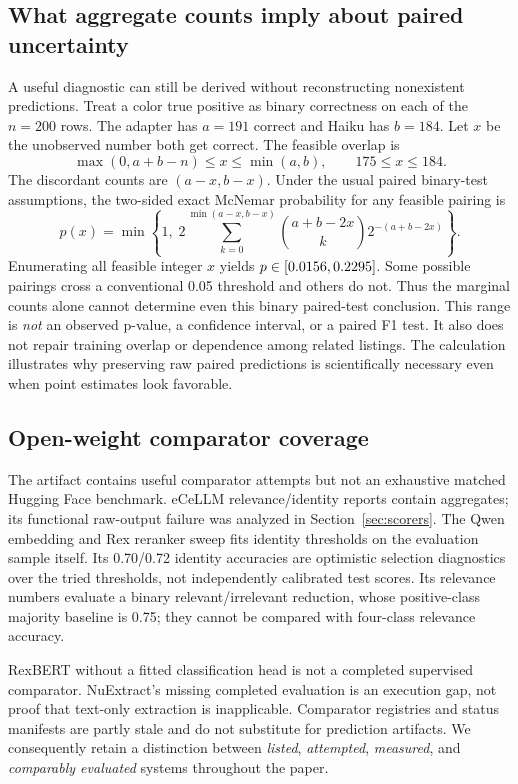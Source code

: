 \subsection{What aggregate counts imply about paired uncertainty}
\label{sec:bounds}
A useful diagnostic can still be derived without reconstructing nonexistent predictions. Treat a color true positive as binary correctness on each of the $n=200$ rows. The adapter has $a=191$ correct and Haiku has $b=184$. Let $x$ be the unobserved number both get correct. The feasible overlap is
\begin{equation}
 \max(0,a+b-n)\leq x\leq\min(a,b),\qquad 175\leq x\leq184.
\end{equation}
The discordant counts are $(a-x,b-x)$. Under the usual paired binary-test assumptions, the two-sided exact McNemar probability for any feasible pairing is
\begin{equation}
 p(x)=\min\left\{1,\;2\sum_{k=0}^{\min(a-x,b-x)}
 {a+b-2x\choose k}2^{-(a+b-2x)}\right\}.
\label{eq:pair}
\end{equation}
Enumerating all feasible integer $x$ yields $p\in[0.0156{},0.2295{}]$. Some possible pairings cross a conventional 0.05 threshold and others do not. Thus the marginal counts alone cannot determine even this binary paired-test conclusion. This range is \emph{not} an observed p-value, a confidence interval, or a paired F1 test. It also does not repair training overlap or dependence among related listings. The calculation illustrates why preserving raw paired predictions is scientifically necessary even when point estimates look favorable.

\subsection{Open-weight comparator coverage}
The artifact contains useful comparator attempts but not an exhaustive matched Hugging Face benchmark. eCeLLM relevance/identity reports contain aggregates; its functional raw-output failure was analyzed in Section~\ref{sec:scorers}. The Qwen embedding and Rex reranker sweep fits identity thresholds on the evaluation sample itself. Its 0.70/0.72 identity accuracies are optimistic selection diagnostics over the tried thresholds, not independently calibrated test scores. Its relevance numbers evaluate a binary relevant/irrelevant reduction, whose positive-class majority baseline is 0.75; they cannot be compared with four-class relevance accuracy.

RexBERT without a fitted classification head is not a completed supervised comparator. NuExtract's missing completed evaluation is an execution gap, not proof that text-only extraction is inapplicable. Comparator registries and status manifests are partly stale and do not substitute for prediction artifacts. We consequently retain a distinction between \emph{listed}, \emph{attempted}, \emph{measured}, and \emph{comparably evaluated} systems throughout the paper.
